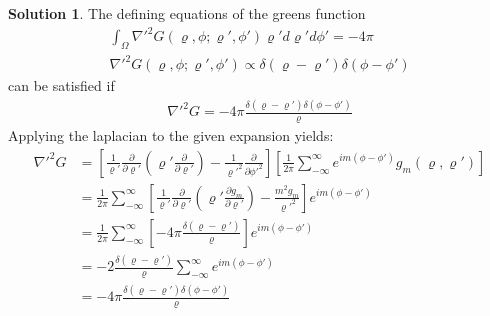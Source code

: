 \documentclass[letter,12pt]{article}
\theoremstyle{definition}
\newtheorem*{sol}{Solution}
\begin{document}
\begin{enumerate}
\begin{enumerate}
                \begin{sol}
                    The defining equations of the greens function
                    \begin{align*}
                        \int_\Omega \nabla'^2 G(\varrho, \phi;\varrho', \phi') \varrho' d\varrho' d\phi' = -4 \pi
                        \\
                        \nabla'^2 G(\varrho, \phi; \varrho', \phi') \propto \delta(\varrho - \varrho')\delta(\phi - \phi')
                    \end{align*}
                    can be satisfied if
                    \begin{align*}
                        \nabla'^2 G = -4\pi \frac{\delta(\varrho - \varrho')\delta(\phi - \phi')}{\varrho}
                    \end{align*}
                    Applying the laplacian to the given expansion yields:
                    \begin{align*}
                        \nabla'^2 G &= \left[
                        \frac{1}{\varrho'}
                        \frac{\partial}{\partial \varrho'}
                        \left(\varrho' \frac{\partial}{\partial \varrho'}\right)
                        - \frac{1}{\varrho'^2}\frac{\partial}{\partial \phi'^2}
                    \right]
                    \left[
                        \frac{1}{2\pi}\sum_{-\infty}^\infty e^{im(\phi -\phi')}g_m(\varrho, \varrho')
                    \right]
                    \\
                    &=
                    \frac{1}{2\pi}\sum_{-\infty}^\infty
                    \left[
                        \frac{1}{\varrho'}
                        \frac{\partial}{\partial \varrho'}
                        \left(\varrho' \frac{\partial g_m}{\partial \varrho'}\right)
                        - \frac{m^2 g_m}{\varrho'^2}
                    \right]
                    e^{im(\phi - \phi')}
                    \\
                    &=
                    \frac{1}{2\pi}\sum_{-\infty}^\infty
                    \left[
                        -4 \pi \frac{\delta(\varrho - \varrho')}{\varrho}
                    \right]
                    e^{im(\phi - \phi')}
                    \\
                    &= -2 \frac{\delta(\varrho - \varrho')}{\varrho}
                    \sum_{-\infty}^\infty
                    e^{im(\phi - \phi')}
                    \\
                    &= -4 \pi \frac{\delta(\varrho - \varrho')\delta(\phi - \phi')}{\varrho}

\end{align*}
\end{sol}
\end{enumerate}
\end{enumerate}
\end{document}
